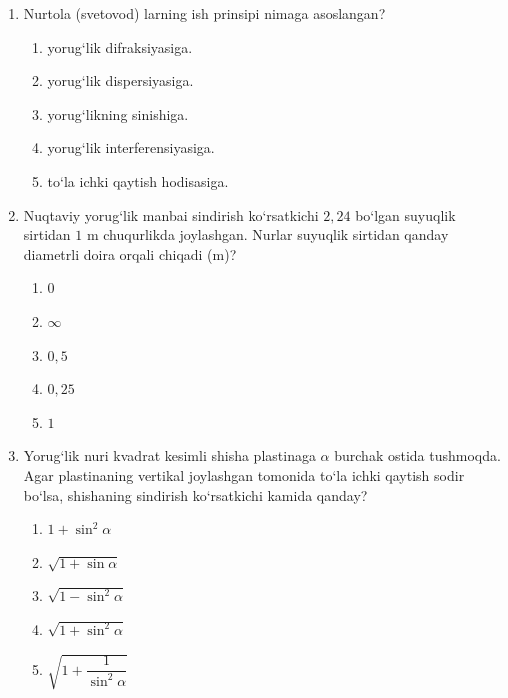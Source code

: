 \begin{enumerate}
\item Nurtola (svetovod) larning ish prinsipi nimaga asoslangan?
\begin{enumerate}[label=\Alph*)]
\item yorug‘lik difraksiyasiga.
\item yorug‘lik dispersiyasiga.
\item yorug‘likning sinishiga.
\item yorug‘lik interferensiyasiga.
\item to‘la ichki qaytish hodisasiga.
\end{enumerate}

\item Nuqtaviy yorug‘lik manbai sindirish ko‘rsatkichi $2,24$ bo‘lgan suyuqlik sirtidan $1$ m chuqurlikda joylashgan. Nurlar suyuqlik sirtidan qanday diametrli doira orqali chiqadi (m)?
\begin{enumerate}[label=\Alph*)]
\item $0$
\item $\infty$
\item $0,5$
\item $0,25$
\item $1$
\end{enumerate}

\item Yorug‘lik nuri kvadrat kesimli shisha plastinaga $\alpha$ burchak ostida tushmoqda. Agar plastinaning vertikal joylashgan tomonida to‘la ichki qaytish sodir bo‘lsa, shishaning sindirish ko‘rsatkichi kamida qanday?


\begin{enumerate}[label=\Alph*)]
\item $1+\sin^2\alpha$
\item $\sqrt{1+\sin\alpha}$
\item $\sqrt{1-\sin^2\alpha}$
\item $\sqrt{1+\sin^2\alpha}$
\item $\sqrt{1+\dfrac{1}{\sin^2\alpha}}$
\end{enumerate}


\end{enumerate}
